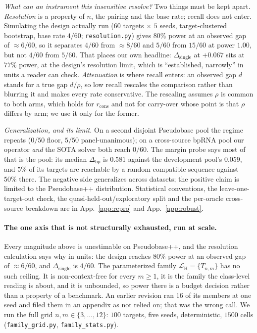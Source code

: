 \documentclass[11pt]{article}
\begin{document}
\emph{What can an instrument this insensitive resolve?} Two things must be kept apart. \emph{Resolution} is a property of $n$, the pairing and the base rate; recall does not enter. Simulating the
design actually run ($60$ targets $\times$ $5$ seeds, target-clustered bootstrap, base rate $4/60$;
\texttt{resolution.py}) gives $80\%$ power at an observed gap of $\approx\!6/60$, so it separates $4/60$ from $\approx\!8/60$ and $5/60$ from
$15/60$ at power $1.00$, but not $4/60$ from $5/60$. That places our own headline: $\Delta_{\mathrm{single}}$ at
${+}0.067$ sits at $77\%$ power, at the design's resolution limit, which is ``established, narrowly'' in units
a reader can check. \emph{Attenuation} is where recall enters: an observed gap $d$ stands for a true gap
$d/\rho$, so low recall rescales the comparison rather than blurring it and makes every rate conservative. The
rescaling assumes $\rho$ is common to both arms, which holds for $r_{\mathrm{cons}}$ and not for carry-over
whose point is that $\rho$ differs by arm; we use it only for the former.

\emph{Generalization, and its limit.} On a second disjoint Pseudobase pool the regime repeats ($0/50$ floor,
$5/50$ panel-unanimous); on a cross-source bpRNA pool our operator \emph{and} the SOTA solver both reach
$0/60$. The margin probe says most of that is the pool: its median $\Delta_{\mathrm{bp}}$ is $0.581$ against
the development pool's $0.059$, and $5\%$ of its targets are reachable by a random compatible sequence against
$50\%$ there. The negative side generalizes across datasets; the positive claim is limited to the Pseudobase++
distribution. Statistical conventions, the leave-one-target-out check, the quasi-held-out/exploratory split and
the per-oracle cross-source breakdown are in App.~\ref{app:repro} and App.~\ref{app:robust}.

\paragraph{The one axis that is not structurally exhausted, run at scale.} Every magnitude above is
unestimable on Pseudobase++, and the resolution calculation says why in units: the design reaches $80\%$ power
at an observed gap of $\approx\!6/60$, and $\Delta_{\mathrm{single}}$ is $4/60$. The parameterized family
$\mathcal L_{\mathrm H}=\{T_{n,m}\}$ has no such ceiling. It is non-context-free for every $m\ge1$, it is the
family the class-level reading is about, and it is unbounded, so power there is a budget decision rather than a
property of a benchmark. An earlier revision ran $16$ of its members at one seed and filed them in an appendix
as not relied on; that was the wrong call. We run the full grid $n,m\in\{3,\dots,12\}$: $100$ targets, five
seeds, deterministic, $1500$ cells (\texttt{family\_grid.py}, \texttt{family\_stats.py}).
\end{document}
